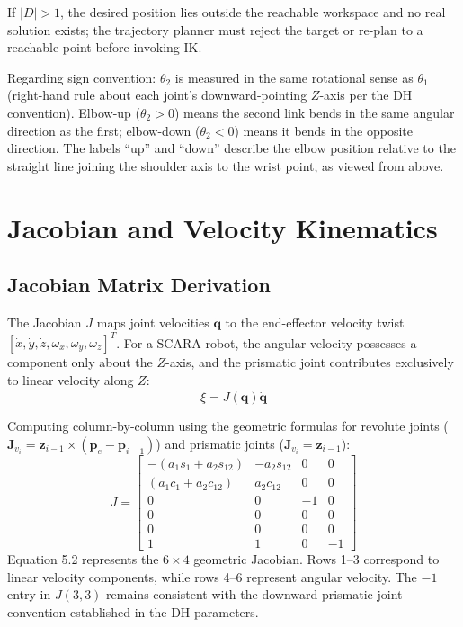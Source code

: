 \documentclass{article}
\begin{document}
If $|D| > 1$, the desired position lies outside the reachable workspace and no real solution exists; the trajectory planner must reject the target or re-plan to a reachable point before invoking IK.

Regarding sign convention: $\theta_2$ is measured in the same rotational sense as $\theta_1$ (right-hand rule about each joint's downward-pointing $Z$-axis per the DH convention). Elbow-up ($\theta_2 > 0$) means the second link bends in the same angular direction as the first; elbow-down ($\theta_2 < 0$) means it bends in the opposite direction. The labels ``up'' and ``down'' describe the elbow position relative to the straight line joining the shoulder axis to the wrist point, as viewed from above.


\section{Jacobian and Velocity Kinematics}

\subsection{Jacobian Matrix Derivation}
The Jacobian $J$ maps joint velocities $\dot{\mathbf{q}}$ to the end-effector velocity twist $[\dot{x}, \dot{y}, \dot{z}, \omega_x, \omega_y, \omega_z]^T$. For a SCARA robot, the angular velocity possesses a component only about the $Z$-axis, and the prismatic joint contributes exclusively to linear velocity along $Z$:
\begin{equation}
\dot{\xi} = J(\mathbf{q}) \dot{\mathbf{q}} \tag{5.1}
\end{equation}

Computing column-by-column using the geometric formulas for revolute joints ($\mathbf{J}_{v_i} = \mathbf{z}_{i-1} \times (\mathbf{p}_e - \mathbf{p}_{i-1})$) and prismatic joints ($\mathbf{J}_{v_i} = \mathbf{z}_{i-1}$):
\begin{equation}
J = \begin{bmatrix}
-(a_1 s_1 + a_2 s_{12}) & -a_2 s_{12} & 0 & 0 \\
(a_1 c_1 + a_2 c_{12}) & a_2 c_{12} & 0 & 0 \\
0 & 0 & -1 & 0 \\
0 & 0 & 0 & 0 \\
0 & 0 & 0 & 0 \\
1 & 1 & 0 & -1
\end{bmatrix} \tag{5.2}
\end{equation}
Equation 5.2 represents the $6 \times 4$ geometric Jacobian. Rows 1--3 correspond to linear velocity components, while rows 4--6 represent angular velocity. The $-1$ entry in $J(3,3)$ remains consistent with the downward prismatic joint convention established in the DH parameters.
\end{document}
